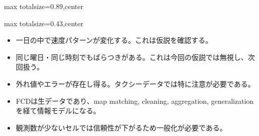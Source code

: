 \begin{minipage}[t]{0.58\textwidth}
\begin{adjustbox}{max totalsize={\textwidth}{0.89\textheight},center}
\begin{minipage}{\textwidth}
\end{minipage}
\end{adjustbox}
\end{minipage}


\clearpage
{}
\begin{minipage}[t]{0.405\textwidth}
\begin{adjustbox}{max totalsize={\textwidth}{0.43\textheight},center}
\begin{minipage}{\textwidth}\scriptsize
{}\begin{itemize}
\item 一日の中で速度パターンが変化する。これは仮説を確認する。
\item 同じ曜日・同じ時刻でもばらつきがある。これは今回の仮説では無視し、次回扱う。
\item 外れ値やエラーが存在し得る。タクシーデータでは特に注意が必要である。
\end{itemize}\begin{itemize}
\item FCDは生データであり、map matching, cleaning, aggregation, generalization を経て情報モデルになる。
\item 観測数が少ないセルでは信頼性が下がるため一般化が必要である。
\end{itemize}
\end{minipage}
\end{adjustbox}
\end{minipage}\hfill
